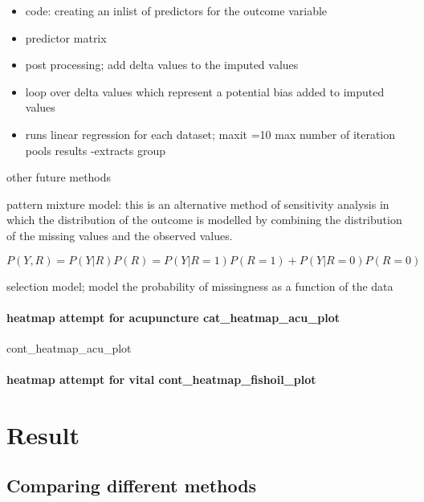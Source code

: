 \documentclass{article}
\providecommand{\tightlist}{%
  \setlength{\itemsep}{0pt}\setlength{\parskip}{0pt}}
\begin{document}
\begin{itemize}
\tightlist
\item
  code: creating an inlist of predictors for the outcome variable
\item
  predictor matrix
\item
  post processing; add delta values to the imputed values
\item
  loop over delta values which represent a potential bias added to
  imputed values
\item
  runs linear regression for each dataset; maxit =10 max number of
  iteration pools results -extracts group
\end{itemize}

other future methods

pattern mixture model: this is an alternative method of sensitivity
analysis in which the distribution of the outcome is modelled by
combining the distribution of the missing values and the observed
values.

\[P(Y,R)=P(Y|R)P(R)=P(Y|R=1)P(R=1)+P(Y|R=0)P(R=0)\]

selection model; model the probability of missingness as a function of
the data

\paragraph{heatmap attempt for acupuncture
cat\_heatmap\_acu\_plot}\label{heatmap-attempt-for-acupuncture-cat_heatmap_acu_plot}

cont\_heatmap\_acu\_plot

\paragraph{heatmap attempt for vital
cont\_heatmap\_fishoil\_plot}\label{heatmap-attempt-for-vital-cont_heatmap_fishoil_plot}

\section{Result}\label{result}

\subsection{Comparing different
methods}\label{comparing-different-methods}
\end{document}
